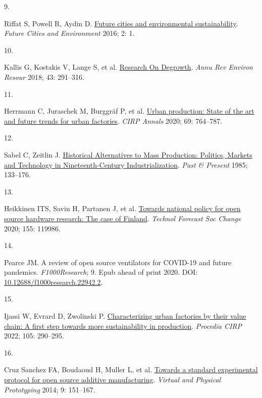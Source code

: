 \documentclass[
  11pt,
  a4paperpaper,
  onecolumn]{article}
\newlength{\cslhangindent}
\newlength{\csllabelwidth}
\newlength{\cslentryspacingunit} %
\newenvironment{CSLReferences}[2] %
 {%
  \setlength{\parindent}{0pt}
  \ifodd #1
  \let\oldpar\par
  \def\par{\hangindent=\cslhangindent\oldpar}
  \fi
  \setlength{\parskip}{#2\cslentryspacingunit}
 }%
 {}
\newcommand{\CSLLeftMargin}[1]{\parbox[t]{\csllabelwidth}{#1}}
\newcommand{\CSLRightInline}[1]{\parbox[t]{\linewidth - \csllabelwidth}{#1}\break}
\begin{document}
\begin{CSLReferences}{0}{0}
\leavevmode{}%
\CSLLeftMargin{9. }%
\CSLRightInline{Riffat S, Powell R, Aydin D.
\href{https://doi.org/10.1186/s40984-016-0014-2}{Future cities and
environmental sustainability}. \emph{Future Cities and Environment}
2016; 2: 1.}

\leavevmode{}%
\CSLLeftMargin{10. }%
\CSLRightInline{Kallis G, Kostakis V, Lange S, et al.
\href{https://doi.org/10.1146/annurev-environ-102017-025941}{Research
{On Degrowth}}. \emph{Annu Rev Environ Resour} 2018; 43: 291--316.}

\leavevmode{}%
\CSLLeftMargin{11. }%
\CSLRightInline{Herrmann C, Juraschek M, Burggräf P, et al.
\href{https://doi.org/10.1016/j.cirp.2020.05.003}{Urban production:
{State} of the art and future trends for urban factories}. \emph{CIRP
Annals} 2020; 69: 764--787.}

\leavevmode{}%
\CSLLeftMargin{12. }%
\CSLRightInline{Sabel C, Zeitlin J.
\href{https://www.jstor.org/stable/650576}{Historical {Alternatives} to
{Mass Production}: {Politics}, {Markets} and {Technology} in
{Nineteenth-Century Industrialization}}. \emph{Past \& Present} 1985;
133--176.}

\leavevmode{}%
\CSLLeftMargin{13. }%
\CSLRightInline{Heikkinen ITS, Savin H, Partanen J, et al.
\href{https://doi.org/10.1016/j.techfore.2020.119986}{Towards national
policy for open source hardware research: {The} case of {Finland}}.
\emph{Technol Forecast Soc Change} 2020; 155: 119986.}

\leavevmode{}%
\CSLLeftMargin{14. }%
\CSLRightInline{Pearce JM. A review of open source ventilators for
{COVID-19} and future pandemics. \emph{F1000Research}; 9. Epub ahead of
print 2020. DOI:
\href{https://doi.org/10.12688/f1000research.22942.2}{10.12688/f1000research.22942.2}.}

\leavevmode{}%
\CSLLeftMargin{15. }%
\CSLRightInline{Ijassi W, Evrard D, Zwolinski P.
\href{https://doi.org/10.1016/j.procir.2022.02.048}{Characterizing urban
factories by their value chain: A first step towards more sustainability
in production}. \emph{Procedia CIRP} 2022; 105: 290--295.}

\leavevmode{}%
\CSLLeftMargin{16. }%
\CSLRightInline{Cruz Sanchez FA, Boudaoud H, Muller L, et al.
\href{https://doi.org/10.1080/17452759.2014.919553}{Towards a standard
experimental protocol for open source additive manufacturing}.
\emph{Virtual and Physical Prototyping} 2014; 9: 151--167.}


\end{CSLReferences}
\end{document}
